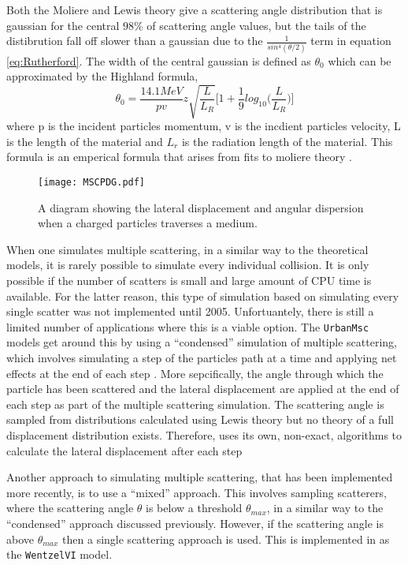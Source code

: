 Both the Moliere and Lewis theory give a scattering angle distribution that is gaussian for the central $98\%$ of scattering angle values, but the tails of the distibrution fall off slower than a gaussian due to the $\frac{1}{sin^4(\theta/2)}$ term in equation \ref{eq:Rutherford}.  The width of the central gaussian is defined as $\theta_0$ which can be approximated by the Highland formula,
\begin{equation}
  \label{eq:Highland}
  \theta_0=\frac{14.1MeV}{pv}z\sqrt{\frac{L}{L_R}}\big[1+\frac{1}{9}log_{10}\big(\frac{L}{L_R}\big)\big]
\end{equation}
where p is the incident particles momentum, v is the incdient particles velocity, L is the length of the material and $L_r$ is the radiation length of the material.  This formula is an emperical formula that arises from fits to moliere theory \cite{Highland1975497}.

\begin{figure}[h]
  \centering
  \texttt{[image: MSCPDG.pdf]}
  \caption{A diagram showing the lateral displacement and angular dispersion when a charged particles traverses a medium.}
  \label{fig:MSCPDG}
\end{figure}

When one simulates multiple scattering, in a similar way to the theoretical models, it is rarely possible to simulate every individual collision.  It is only possible if the number of scatters is small and large amount of CPU time is available.  For the latter reason, this type of simulation based on simulating every single scatter was not implemented until 2005.  Unfortuantely, there is still a limited number of applications where this is a viable option.  The \texttt{UrbanMsc} models get around this by using  a ``condensed'' simulation of multiple scattering, which involves simulating a step of the particles path at a time and applying net effects at the end of each step \cite{Urbàn:592633}.  More sepcifically, the angle through which the particle has been scattered and the lateral displacement are applied at the end of each step as part of the multiple scattering simulation.  The scattering angle is sampled from distributions calculated using Lewis theory but no theory of a full displacement distribution exists.  Therefore, \geant uses its own, non-exact, algorithms to calculate the lateral displacement after each step %

Another approach to simulating multiple scattering, that has been implemented more recently, is to use a ``mixed'' approach.  This involves sampling scatterers, where the scattering angle $\theta$ is below a threshold $\theta_{max}$, in a similar way to the ``condensed'' approach discussed previously.  However, if the scattering angle is above $\theta_{max}$ then a single scattering approach is used.  This is implemented in \geant as the \texttt{WentzelVI} model.

